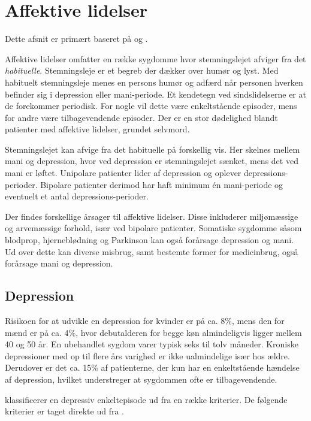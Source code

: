 
\section{Affektive lidelser}\label{sec:affektivelidelser}
Dette afsnit er primært baseret på \citet{misc:affektivelidelser, misc:netpsykdepression, misc:netpsykmani} og \citet{havemann2010grundbog}.

Affektive lidelser omfatter en række sygdomme hvor stemningslejet afviger fra det \textit{habituelle}. 
Stemningsleje er et begreb der dækker over humør og lyst.
Med habituelt stemningsleje menes en persons humør og adfærd når personen hverken befinder sig i depression eller mani-periode.
Et kendetegn ved sindslidelserne er at de forekommer periodisk.
For nogle vil dette være enkeltstående episoder, mens for andre være tilbagevendende episoder.
Der er en stor dødelighed blandt patienter med affektive lidelser, grundet selvmord.

Stemningslejet kan afvige fra det habituelle på forskellig vis.
Her skelnes mellem mani og depression, hvor ved depression er stemningslejet sænket, mens det ved mani er løftet.
Unipolare patienter lider af depression og oplever depressions-perioder.
Bipolare patienter derimod har haft minimum én mani-periode og eventuelt et antal depressions-perioder.

Der findes forskellige årsager til affektive lidelser. 
Disse inkluderer miljømæssige og arvemæssige forhold, især ved bipolare patienter.
Somatiske sygdomme såsom blodprop, hjerneblødning og Parkinson kan også forårsage depression og mani.
Ud over dette kan diverse misbrug, samt bestemte former for medicinbrug, også forårsage mani og depression.

\subsection{Depression}
Risikoen for at udvikle en depression for kvinder er på ca. 8\%, mens den for mænd er på ca. 4\%, hvor debutalderen for begge køn almindeligvis ligger mellem 40 og 50 år.
En ubehandlet sygdom varer typisk seks til tolv måneder.
Kroniske depressioner med op til flere års varighed er ikke ualmindelige især hos ældre.
Derudover er det ca. 15\% af patienterne, der kun har en enkeltstående hændelse af depression, hvilket understreger at sygdommen ofte er tilbagevendende\citep{misc:affektivelidelser}.

 klassificerer en depressiv enkeltepisode ud fra en række kriterier.
De følgende kriterier er taget direkte ud fra \citet{misc:netpsykdepression}.

